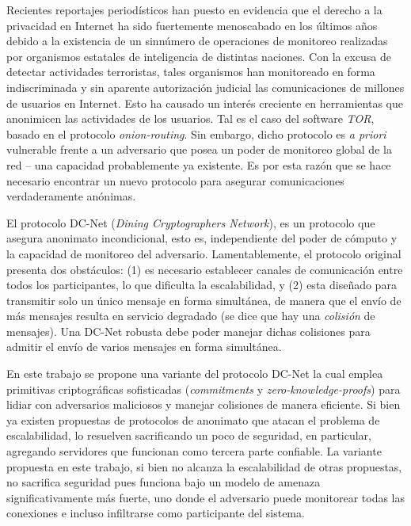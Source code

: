 Recientes reportajes periodísticos han puesto en evidencia que el derecho a la 
privacidad en Internet ha sido fuertemente menoscabado en los últimos años 
debido a la existencia de un sinnúmero de operaciones de monitoreo realizadas 
por organismos estatales de inteligencia de distintas naciones.
Con la excusa de detectar actividades terroristas, tales organismos han 
monitoreado en forma indiscriminada y sin aparente autorización judicial las 
comunicaciones de millones de usuarios en Internet. Esto ha causado un interés 
creciente en herramientas que anonimicen las actividades de los usuarios. 
Tal es el caso del software \emph{TOR}, basado en el protocolo 
\emph{onion-routing}. Sin embargo, dicho protocolo es \emph{a priori} 
vulnerable frente a un adversario que posea un poder de monitoreo global de la 
red -- una capacidad probablemente ya existente. Es por esta razón que se hace 
necesario encontrar un nuevo protocolo para asegurar comunicaciones 
verdaderamente anónimas.

El protocolo DC-Net (\emph{Dining Cryptographers Network}), es un protocolo 
que asegura anonimato incondicional, esto es, independiente del poder de 
cómputo y la capacidad de monitoreo del adversario. Lamentablemente, el 
protocolo original presenta dos obstáculos: (1) es necesario establecer 
canales de comunicación entre todos los participantes, lo que dificulta la 
escalabilidad, y (2) esta diseñado para transmitir solo un único mensaje en 
forma simultánea, de manera que el envío de más mensajes resulta en servicio 
degradado (se dice que hay una \emph{colisión} de mensajes). Una DC-Net 
robusta debe poder manejar dichas colisiones para admitir el envío de varios 
mensajes en forma simultánea.

En este trabajo se propone una variante del protocolo DC-Net la cual emplea 
primitivas criptográficas sofisticadas (\emph{commitments} y 
\emph{zero-knowledge-proofs}) para lidiar con adversarios maliciosos y manejar 
colisiones de manera eficiente. Si bien ya existen propuestas de protocolos de 
anonimato que atacan el problema de escalabilidad, lo resuelven sacrificando 
un poco de seguridad, en particular, agregando servidores que funcionan como 
tercera parte confiable. La variante propuesta en este trabajo, si bien no 
alcanza la escalabilidad de otras propuestas, no sacrifica seguridad pues 
funciona bajo un modelo de amenaza significativamente más fuerte, uno donde el 
adversario puede monitorear todas las conexiones e incluso infiltrarse como 
participante del sistema.

